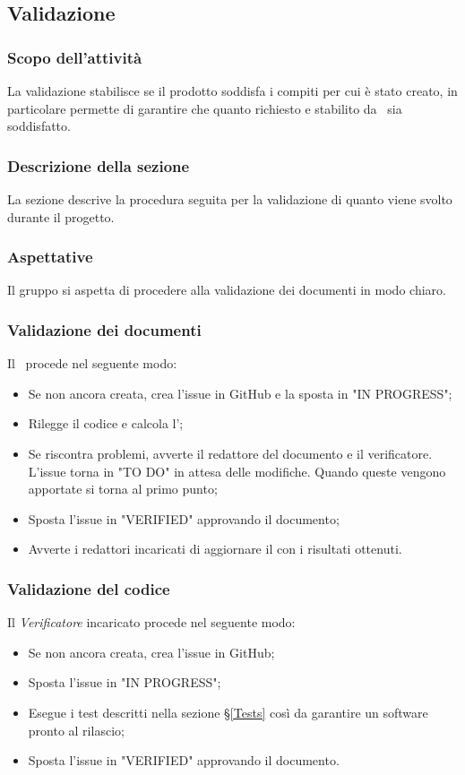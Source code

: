 \subsection{Validazione}\label{PSup_Validazione}
\subsubsection{Scopo dell'attività}\label{PSup_Validazione_Scopo}
La validazione stabilisce se il prodotto soddisfa i compiti per cui è stato creato, in particolare permette di garantire che quanto richiesto e stabilito da \Proponente\ sia soddisfatto.

\subsubsection{Descrizione della sezione} 
La sezione descrive la procedura seguita per la validazione di quanto viene svolto durante il progetto.

\subsubsection{Aspettative}
Il gruppo si aspetta di procedere alla validazione dei documenti in modo chiaro. 

\subsubsection{Validazione dei documenti}\label{ValidazioneDoc}
Il \Responsabile\ procede nel seguente modo:
\begin{itemize}
	\item Se non ancora creata, crea l'issue in GitHub e la sposta in "IN PROGRESS";
	\item Rilegge il codice e calcola l';
	\item Se riscontra problemi, avverte il redattore del documento e il verificatore. L'issue torna in "TO DO" in attesa delle modifiche. Quando queste vengono apportate si torna al primo punto;
	\item Sposta l'issue in "VERIFIED" approvando il documento;
	\item Avverte i redattori incaricati di aggiornare il \PdQv{} con i risultati ottenuti.
\end{itemize}

\subsubsection{Validazione del codice}\label{ValidazioneCodice}
Il \textit{Verificatore} incaricato procede nel seguente modo:
\begin{itemize}
	\item Se non ancora creata, crea l'issue in GitHub;
	\item Sposta l'issue in "IN PROGRESS";
	\item Esegue i test descritti nella sezione \S\ref{Tests} così da garantire un software pronto al rilascio;
	\item Sposta l'issue in "VERIFIED" approvando il documento.
\end{itemize}

